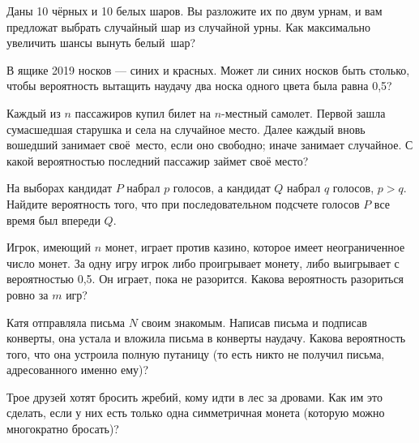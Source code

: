 \documentclass[a4paper,12pt]{article}
\begin{document}


Даны 10 ч\"ерных и 10 белых шаров. Вы разложите их
по двум урнам, и вам предложат выбрать случайный шар из случайной урны.
Как максимально увеличить шансы вынуть белый~шар?


В ящике 2019 носков --- синих и красных. Может ли синих носков быть столько, чтобы вероятность вытащить наудачу два носка одного цвета была равна 0,5?


Каждый из $n$ пассажиров купил билет на $n$-местный самолет.
Первой зашла сумасшедшая старушка и села на случайное место.
Далее каждый вновь вошедший занимает своё~место, если оно свободно;
иначе занимает случайное. С какой вероятностью последний пассажир займет своё место?


На выборах кандидат
$P$ набрал $p$ голосов, а кандидат $Q$ набрал $q$ голосов, %
$p>q$. Найдите вероятность того, что при последовательном подсчете голосов
$P$ все время был впереди $Q$.


Игрок, имеющий $n$ монет, играет против казино, которое имеет
неограниченное число монет. За одну игру игрок либо проигрывает монету,
либо выигрывает с вероятностью 0,5. Он играет, пока не разорится. Какова
вероятность разориться ровно за $m$ игр?


Катя отправляла письма $N$ своим знакомым. Написав письма и подписав конверты, она устала и вложила письма в конверты наудачу. Какова вероятность того, что она устроила полную путаницу (то есть никто не получил письма, адресованного именно ему)?

Трое друзей хотят бросить жребий, кому идти в лес за дровами.
Как им это сделать, если у них есть только одна симметричная монета
(которую можно многократно бросать)?



\end{document}
